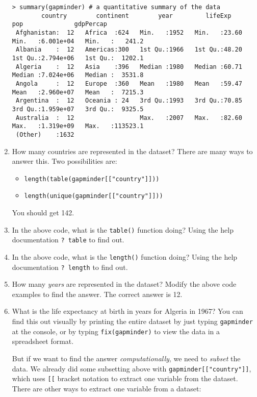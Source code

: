 \documentclass[a4paper,12pt]{article}
\begin{document}
\begin{enumerate}
\begin{verbatim}
> summary(gapminder) # a quantitative summary of the data
        country        continent        year         lifeExp           pop              gdpPercap       
 Afghanistan:  12   Africa  :624   Min.   :1952   Min.   :23.60   Min.   :6.001e+04   Min.   :   241.2  
 Albania    :  12   Americas:300   1st Qu.:1966   1st Qu.:48.20   1st Qu.:2.794e+06   1st Qu.:  1202.1  
 Algeria    :  12   Asia    :396   Median :1980   Median :60.71   Median :7.024e+06   Median :  3531.8  
 Angola     :  12   Europe  :360   Mean   :1980   Mean   :59.47   Mean   :2.960e+07   Mean   :  7215.3  
 Argentina  :  12   Oceania : 24   3rd Qu.:1993   3rd Qu.:70.85   3rd Qu.:1.959e+07   3rd Qu.:  9325.5  
 Australia  :  12                  Max.   :2007   Max.   :82.60   Max.   :1.319e+09   Max.   :113523.1  
 (Other)    :1632
\end{verbatim}
 
\item How many countries are represented in the dataset? There are many ways to answer this. Two possibilities are:

\begin{itemize}
\item \texttt{length(table(gapminder[["country"]]))}
\item \texttt{length(unique(gapminder[["country"]]))}
\end{itemize}

You should get 142.

\item In the above code, what is the \texttt{table()} function doing? Using the help documentation \texttt{? table} to find out.

\item In the above code, what is the \texttt{length()} function doing? Using the help documentation \texttt{? length} to find out.

\item How many \textit{years} are represented in the dataset? Modify the above code examples to find the answer. The correct answer is 12.

\item What is the life expectancy at birth in years for Algeria in 1967? You can find this out visually by printing the entire dataset by just typing \texttt{gapminder} at the console, or by typing \texttt{fix(gapminder)} to view the data in a spreadsheet format.

But if we want to find the answer \textit{computationally}, we need to \textit{subset} the data. We already did some subsetting above with \texttt{gapminder[["country"]]}, which uses \texttt{[[} bracket notation to extract one variable from the dataset. There are other ways to extract one variable from a dataset:


\end{enumerate}
\end{document}
